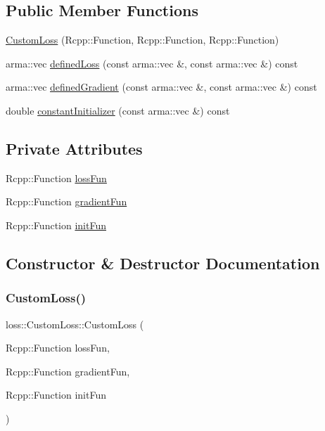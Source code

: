 \subsection*{Public Member Functions}
\begin{DoxyCompactItemize}
\item 
\mbox{\hyperlink{classloss_1_1_custom_loss_ae3e34f8cab5f6c317412a32f27542f92}{Custom\+Loss}} (Rcpp\+::\+Function, Rcpp\+::\+Function, Rcpp\+::\+Function)
\item 
arma\+::vec \mbox{\hyperlink{classloss_1_1_custom_loss_a2a96bc5e4b4894bbaa64745a3f7c0fd5}{defined\+Loss}} (const arma\+::vec \&, const arma\+::vec \&) const
\item 
arma\+::vec \mbox{\hyperlink{classloss_1_1_custom_loss_a3a79dc019e781c2956b52fb8e1cfcc56}{defined\+Gradient}} (const arma\+::vec \&, const arma\+::vec \&) const
\item 
double \mbox{\hyperlink{classloss_1_1_custom_loss_adf283025a8511731504cd5b620cc8b37}{constant\+Initializer}} (const arma\+::vec \&) const
\end{DoxyCompactItemize}
\subsection*{Private Attributes}
\begin{DoxyCompactItemize}
\item 
Rcpp\+::\+Function \mbox{\hyperlink{classloss_1_1_custom_loss_a90aa6d3240cd14bc3ede21af38b70c8a}{loss\+Fun}}
\item 
Rcpp\+::\+Function \mbox{\hyperlink{classloss_1_1_custom_loss_af3f00f7f006f7466c79fff83d763c359}{gradient\+Fun}}
\item 
Rcpp\+::\+Function \mbox{\hyperlink{classloss_1_1_custom_loss_a0c7a32f9ab123e8bc45154103f295055}{init\+Fun}}
\end{DoxyCompactItemize}


\subsection{Constructor \& Destructor Documentation}
\mbox{\label{classloss_1_1_custom_loss_ae3e34f8cab5f6c317412a32f27542f92}} 
\subsubsection{\texorpdfstring{Custom\+Loss()}{CustomLoss()}}
{\footnotesize\ttfamily loss\+::\+Custom\+Loss\+::\+Custom\+Loss (\begin{DoxyParamCaption}\item[{Rcpp\+::\+Function}]{loss\+Fun,  }\item[{Rcpp\+::\+Function}]{gradient\+Fun,  }\item[{Rcpp\+::\+Function}]{init\+Fun }\end{DoxyParamCaption})}



